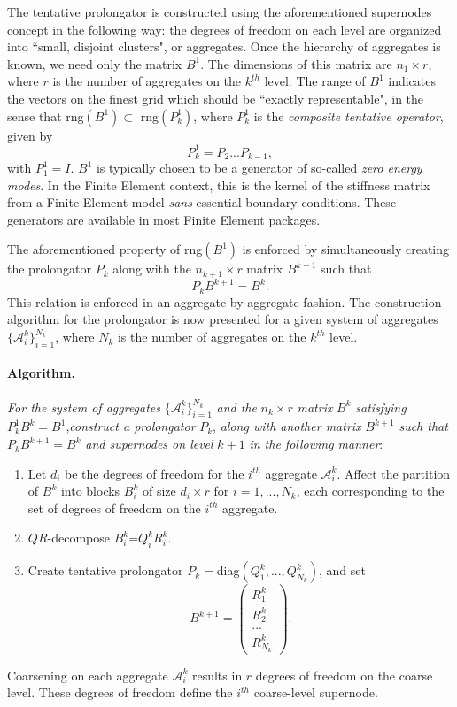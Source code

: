 \documentclass{article}
\begin{document}
The tentative prolongator is constructed using the aforementioned supernodes concept in the following way: the degrees of freedom on each level are organized into ``small, disjoint clusters", or aggregates. Once the hierarchy of aggregates is known, we need only the matrix $B^{1}$. The dimensions of this matrix are $n_{1}\times$$r$, where $r$ is the number of aggregates on the $k^{th}$ level. The range of $B^{1}$ indicates the vectors on the finest grid which should be ``exactly representable", in the sense that rng$\left(B^{1}\right)\subset$ rng$\left(P^{1}_{k}\right)$, where $P^{1}_{k}$ is the {\it composite tentative operator}, given by
\[
P^{1}_{k} = P_{2}...P_{k-1},
\]
\noindent with $P_{1}^{1}=I$. $B^{1}$ is typically chosen to be a generator of so-called {\it zero energy modes}. In the Finite Element context, this is the kernel of the stiffness matrix from a Finite Element model {\it sans} essential boundary conditions. These generators are available in most Finite Element packages. 

The aforementioned property of rng$\left(B^{1}\right)$ is enforced by simultaneously creating the prolongator $P_{k}$ along with the $n_{k+1}\times$$r$ matrix $B^{k+1}$ such that
\[
P_{k}B^{k+1} = B^{k}.
\]
\noindent This relation is enforced in an aggregate-by-aggregate fashion. The construction algorithm for the prolongator is now presented for a given system of aggregates $\{\mathcal{A}_{i}^{k}\}_{i=1}^{N_{k}}$, where $N_{k}$ is the number of aggregates on the $k^{th}$ level.
\paragraph{{\bf Algorithm.}} {\it For the system of aggregates} $\{\mathcal{A}_{i}^{k}\}_{i=1}^{N_{k}}$ {\it and the} $n_{k}\times$$r$ {\it matrix} $B^{k}$ {\it satisfying} $P_{k}^{1}B^{k}=B^{1}$,{\it construct a prolongator} $P_{k}$, {\it along with another matrix} $B^{k+1}$ {\it such that} $P_{k}B^{k+1}=B^{k}$ {\it and supernodes on level} $k+1$ {\it in the following manner}:
\begin{enumerate}
\item Let $d_{i}$ be the degrees of freedom for the $i^{th}$ aggregate $\mathcal{A}_{i}^{k}$. Affect the partition of $B^{k}$ into blocks $B_{i}^{k}$ of size $d_{i}\times$$r$ for $i=1,...,N_{k}$, each corresponding to the set of degrees of freedom on the $i^{th}$ aggregate.
\item $QR$-decompose $B_{i}^{k}$=$Q_{i}^{k}R_{i}^{k}$.
\item Create tentative prolongator $P_{k}=$diag$\left(Q_{1}^{k},...,Q_{N_{k}}^{k}\right)$, and set
\[ B^{k+1}=\left( \begin{array}{c}
R_{1}^{k}\\
R_{2}^{k}\\
...\\
R_{N_{k}}^{k}\end{array} \right).\] 
\end{enumerate}
\noindent Coarsening on each aggregate $\mathcal{A}_{i}^{k}$ results in $r$ degrees of freedom on the coarse level. These degrees of freedom define the $i^{th}$ coarse-level supernode.
\end{document}
